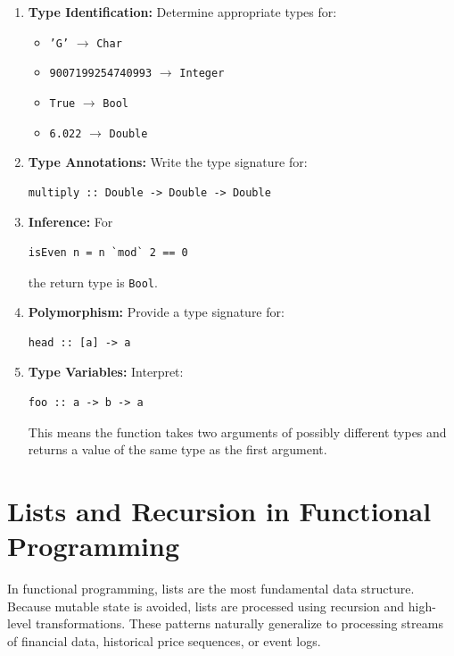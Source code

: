 \documentclass[12pt]{article}
\begin{document}
\begin{enumerate}
  \item \textbf{Type Identification:} Determine appropriate types for:
        \begin{itemize}
          \item \texttt{'G'} $\rightarrow$ \texttt{Char}
          \item \texttt{9007199254740993} $\rightarrow$ \texttt{Integer}
          \item \texttt{True} $\rightarrow$ \texttt{Bool}
          \item \texttt{6.022} $\rightarrow$ \texttt{Double}
        \end{itemize}

  \item \textbf{Type Annotations:} Write the type signature for:
        \begin{verbatim}
multiply :: Double -> Double -> Double
\end{verbatim}

  \item \textbf{Inference:} For
        \begin{verbatim}
isEven n = n `mod` 2 == 0
\end{verbatim}
        the return type is \texttt{Bool}.

  \item \textbf{Polymorphism:} Provide a type signature for:
        \begin{verbatim}
head :: [a] -> a
\end{verbatim}

  \item \textbf{Type Variables:} Interpret:
        \begin{verbatim}
foo :: a -> b -> a
\end{verbatim}
        This means the function takes two arguments of possibly different types and returns a value of the same type as the first argument.
\end{enumerate}



\section{Lists and Recursion in Functional Programming}

In functional programming, lists are the most fundamental data structure. Because mutable state is avoided, lists are processed using recursion and high-level transformations. These patterns naturally generalize to processing streams of financial data, historical price sequences, or event logs.
\end{document}
